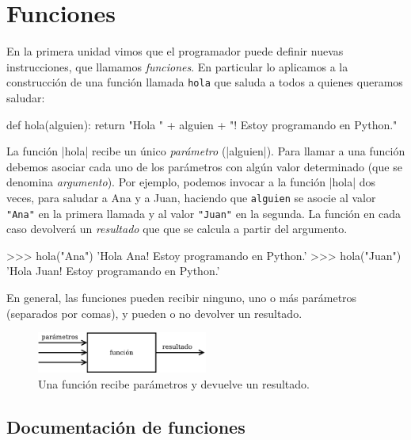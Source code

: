 \chapter[Funciones]{Funciones}
\label{chapter:funciones}

En la primera unidad vimos que el programador puede definir nuevas
instrucciones, que llamamos {\it funciones}. En particular lo aplicamos a la
construcción de una función llamada \lstinline+hola+ que saluda a todos a
quienes queramos saludar:

\begin{codigo-python-sn}
def hola(alguien):
	return "Hola " + alguien + "! Estoy programando en Python."
\end{codigo-python-sn}

La función |hola| recibe un único {\it parámetro} (|alguien|). Para llamar a
una función debemos asociar cada uno de los parámetros con algún valor
determinado (que se denomina {\it argumento}). Por ejemplo, podemos invocar a
la función |hola| dos veces, para saludar a Ana y a Juan, haciendo que
\lstinline+alguien+ se asocie al valor \lstinline!"Ana"! en la primera llamada
y al valor \lstinline!"Juan"! en la segunda. La función en cada caso devolverá
un {\it resultado} que que se calcula a partir del argumento.

\begin{codigo-python-sn}
>>> hola("Ana")
'Hola Ana! Estoy programando en Python.'
>>> hola("Juan")
'Hola Juan! Estoy programando en Python.'
\end{codigo-python-sn}

En general, las funciones pueden recibir ninguno, uno o más parámetros
(separados por comas), y pueden o no devolver un resultado.

\begin{figure}[ht]
\caption{Una función recibe parámetros y devuelve un resultado.}
\begin{center}
\includegraphics[width=0.5\textwidth]{graficos/funcion}
\end{center}
\end{figure}

\section{Documentación de funciones}

